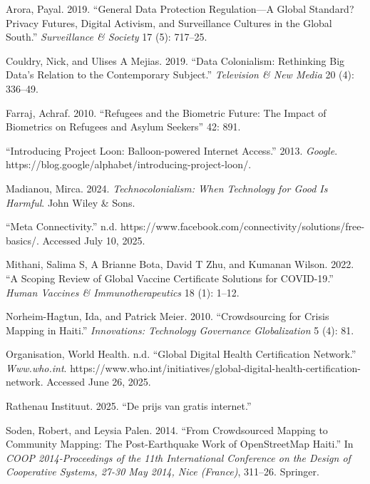 \documentclass[
  letterpaper,
  DIV=11,
  numbers=noendperiod]{scrartcl}
\newlength{\cslhangindent}
\newenvironment{CSLReferences}[2] %
 {\begin{list}{}{%
  \setlength{\itemindent}{0pt}
  \setlength{\leftmargin}{0pt}
  \setlength{\parsep}{0pt}
  \ifodd #1
   \setlength{\leftmargin}{\cslhangindent}
   \setlength{\itemindent}{-1\cslhangindent}
  \fi
  \setlength{\itemsep}{#2\baselineskip}}}
 {\end{list}}
\begin{document}
\label{refs}
\begin{CSLReferences}{1}{0}
Arora, Payal. 2019. {``General Data Protection Regulation---{A} Global
Standard? {Privacy} Futures, Digital Activism, and Surveillance Cultures
in the {Global South}.''} \emph{Surveillance \& Society} 17 (5):
717--25.

Couldry, Nick, and Ulises A Mejias. 2019. {``Data Colonialism:
{Rethinking} Big Data's Relation to the Contemporary Subject.''}
\emph{Television \& New Media} 20 (4): 336--49.

Farraj, Achraf. 2010. {``Refugees and the Biometric Future: The Impact
of Biometrics on Refugees and Asylum Seekers''} 42: 891.

{``Introducing {Project Loon}: {Balloon-powered Internet} Access.''}
2013. \emph{Google}.
https://blog.google/alphabet/introducing-project-loon/.

Madianou, Mirca. 2024. \emph{Technocolonialism: {When} Technology for
Good Is Harmful}. John Wiley \& Sons.

{``Meta {Connectivity}.''} n.d.
https://www.facebook.com/connectivity/solutions/free-basics/. Accessed
July 10, 2025.

Mithani, Salima S, A Brianne Bota, David T Zhu, and Kumanan Wilson.
2022. {``A Scoping Review of Global Vaccine Certificate Solutions for
{COVID-19}.''} \emph{Human Vaccines \& Immunotherapeutics} 18 (1):
1--12.

Norheim-Hagtun, Ida, and Patrick Meier. 2010. {``Crowdsourcing for
Crisis Mapping in {Haiti}.''} \emph{Innovations: Technology{\textbar}
Governance{\textbar} Globalization} 5 (4): 81.

Organisation, World Health. n.d. {``Global {Digital Health Certification
Network}.''} \emph{Www.who.int}.
https://www.who.int/initiatives/global-digital-health-certification-network.
Accessed June 26, 2025.

Rathenau Instituut. 2025. {``{De prijs van gratis internet}.''}

Soden, Robert, and Leysia Palen. 2014. {``From Crowdsourced Mapping to
Community Mapping: {The} Post-Earthquake Work of {OpenStreetMap
Haiti}.''} In \emph{{COOP} 2014-Proceedings of the 11th International
Conference on the Design of Cooperative Systems, 27-30 May 2014, Nice
(France)}, 311--26. Springer.

\end{CSLReferences}
\end{document}
